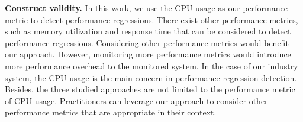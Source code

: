\noindent \textbf{Construct validity.}
In this work, we use the CPU usage as our performance metric to detect performance regressions.
There exist other performance metrics, such as memory utilization and response time that can be considered to detect performance regressions. 
Considering other performance metrics would benefit our approach.
However, monitoring more performance metrics would introduce more performance overhead to the monitored system.
In the case of our industry system, the CPU usage is the main concern in performance regression detection.
Besides, the three studied approaches are not limited to the performance metric of CPU usage. Practitioners can leverage our approach to consider other performance metrics that are appropriate in their context.